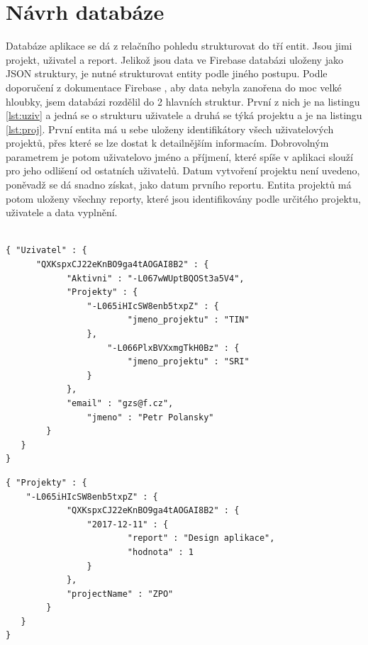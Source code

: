 \section{Návrh databáze}

Databáze aplikace se dá z relačního pohledu strukturovat do tří entit. Jsou jimi projekt, uživatel a report. Jelikož jsou data ve Firebase databázi uloženy jako JSON struktury, je nutné strukturovat entity podle jiného postupu. Podle doporučení z dokumentace Firebase \cite{firebase}, aby data nebyla zanořena do moc velké hloubky, jsem databázi rozdělil do 2 hlavních struktur. První z nich je na listingu \ref{lst:uziv} a jedná se o strukturu uživatele a druhá se týká projektu a je na listingu \ref{lst:proj}. První entita má u sebe uloženy identifikátory všech uživatelových projektů, přes které se lze dostat k detailnějším informacím. Dobrovolným parametrem je potom uživatelovo jméno a příjmení, které spíše v aplikaci slouží pro jeho odlišení od ostatních uživatelů. Datum vytvoření projektu není uvedeno, poněvadž se dá snadno získat, jako datum prvního reportu. Entita projektů má potom uloženy všechny reporty, které jsou identifikovány podle určitého projektu, uživatele a data vyplnění. 

\begin{lstlisting}[frame=single, caption={Ukázka návrhu struktury dat z Firebase databáze pro určitého uživatele. V tomto případě má uživatel identifikátor "QXKspxCJ22eKnBO9ga4tAOGAI8B2". Snímek ukazuje, že uživatel má aktuálně aktivní projekt s identifikátorem 
"-L067wWUptBQOSt3a5V4", pracuje na projektech "TIN"~ a "SRI".}, captionpos=b,label={lst:uziv}]

{ "Uzivatel" : {
      "QXKspxCJ22eKnBO9ga4tAOGAI8B2" : {
        	"Aktivni" : "-L067wWUptBQOSt3a5V4",
        	"Projekty" : {
          		"-L065iHIcSW8enb5txpZ" : {
            			"jmeno_projektu" : "TIN"
          		}, 
                	"-L066PlxBVXxmgTkH0Bz" : {
            			"jmeno_projektu" : "SRI"
          		}
        	},
        	"email" : "gzs@f.cz",
            	"jmeno" : "Petr Polansky"
      	}
   }   
}
\end{lstlisting}

\begin{lstlisting}[frame=single, caption={Návrh struktury uložení dat pro určitý projekt. "-L065iHIcSW8enb5txpZ"~ je identifikátor konkrétního projektu a "QXKspxCJ22eKnBO9ga4tAOGAI8B2"~ je identifikátor konkrétního uživatele. V tomto případě uživatel do projektu s názvem "ZPO" ~vyplnil pro den 11.12.2017 report se zprávou "Design aplikace"~ a ohodnotil se známkou 1.}, captionpos=b, label={lst:proj}]
{ "Projekty" : {
	"-L065iHIcSW8enb5txpZ" : {
        	"QXKspxCJ22eKnBO9ga4tAOGAI8B2" : {
          		"2017-12-11" : {            			
            			"report" : "Design aplikace",
            			"hodnota" : 1
          		}
        	},
        	"projectName" : "ZPO"
    	}
   }	
}
    
\end{lstlisting}

